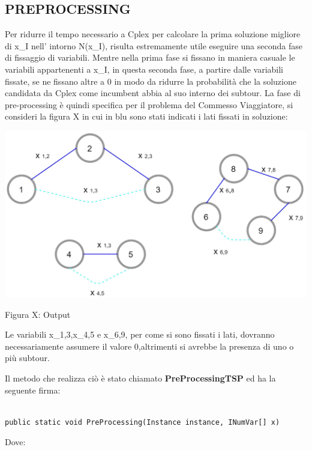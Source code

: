 \documentclass[11pt]{article}
\begin{document}
\subsection*{PREPROCESSING}

Per ridurre il tempo necessario a Cplex per calcolare la prima soluzione migliore di x_I nell' intorno N(x_I), risulta estremamente utile eseguire una seconda fase di fissaggio di variabili. Mentre nella prima fase si fissano in maniera casuale le variabili appartenenti a x_I, in questa seconda fase, a partire dalle variabili fissate, se ne fissano altre a 0 in modo da ridurre la probabilità che la soluzione candidata da Cplex come incumbent abbia al suo interno dei subtour. La fase di pre-processing è quindi specifica per il problema del Commesso Viaggiatore, si consideri la figura X in cui in blu sono stati indicati i lati fissati in soluzione:

\begin{center}
    \includegraphics[scale=0.5]{PreProcessing}  
    
    Figura X: Output 
    
\end{center}

Le variabili x_{1,3},x_{4,5} e x_{6,9}, per come si sono fissati i lati, dovranno necessariamente assumere il valore 0,altrimenti si avrebbe la presenza di uno o più subtour. 

Il metodo che realizza ciò è stato chiamato \textbf{PreProcessingTSP} ed ha la seguente firma:

\begin{lstlisting}

public static void PreProcessing(Instance instance, INumVar[] x)

\end{lstlisting}

Dove:
\end{document}
